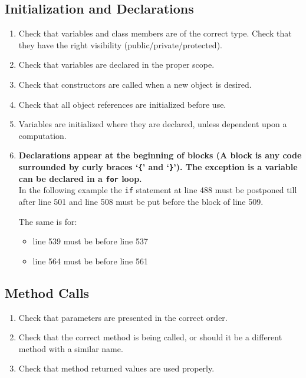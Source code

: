 \documentclass[a4paper,11pt]{report} %
\begin{document}
		\subsection*{Initialization and Declarations}\begin{enumerate}[resume]
			\item Check that variables and class members are of the correct type. Check that they have the right visibility (public/private/protected).
			\item Check that variables are declared in the proper scope.
			\item Check that constructors are called when a new object is desired.
			\item Check that all object references are initialized before use.
			\item Variables are initialized where they are declared, unless dependent upon a computation.
			\item \textbf{Declarations appear at the beginning of blocks (A block is any code surrounded by curly braces `\texttt{\{}' and `\texttt{\}}'). The exception is a variable can be declared in a \texttt{for} loop.} \smallskip \\
				In the following example the \texttt{if} statement at line 488 must be postponed till after line 501 and line 508 must be put before the block of line 509.
				
				The same is for:
				\begin{itemize}
					\item line 539 must be before line 537
					\item line 564 must be before line 561
				\end{itemize}
		\end{enumerate}
		
		\subsection*{Method Calls}\begin{enumerate}[resume]
			\item Check that parameters are presented in the correct order.
			\item Check that the correct method is being called, or should it be a different method with a similar name.
			\item Check that method returned values are used properly.
		\end{enumerate}
		
\end{document}
